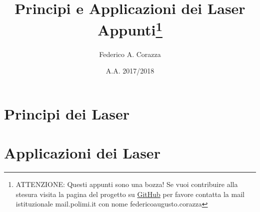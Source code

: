 \documentclass{book}
\title{Principi e Applicazioni dei Laser\\ Appunti\thanks{ATTENZIONE: Questi appunti sono una bozza! Se vuoi contribuire alla stesura visita la pagina del progetto su \href{https://github.com/Imperator26/Principi-e-Applicazioni-dei-Laser-Appunti}{GitHub} per favore contatta la mail istituzionale mail.polimi.it con nome federicoaugusto.corazza}}
\date{A.A. 2017/2018}
\author{Federico A. Corazza}
\theoremstyle{remark}
\begin{document}
\maketitle
\tableofcontents
\cleardoublepage

\part{Principi dei Laser}




\part{Applicazioni dei Laser}





\end{document}
